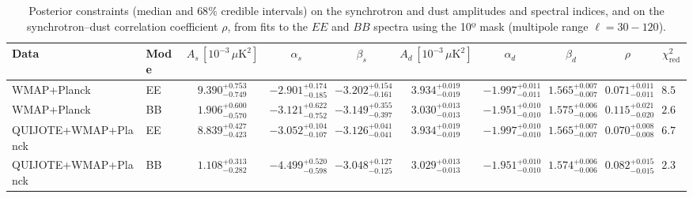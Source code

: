 \begin{table}[h]
\centering
\scriptsize
\setlength{\tabcolsep}{4pt}
\caption{Posterior constraints (median and $68\%$ credible intervals) on the synchrotron and dust amplitudes and spectral indices, and on the synchrotron--dust correlation coefficient $\rho$, from fits to the $EE$ and $BB$ spectra using the 10º mask (multipole range $\ell=30-120$).}
\label{tab:fit_results}
\begin{tabular}{llcccccccc}
\toprule
Data & Mode & $A_s\,[10^{-3}\,\mu\mathrm{K}^2]$ & $\alpha_s$ & $\beta_s$ & $A_d\,[10^{-3}\,\mu\mathrm{K}^2]$ & $\alpha_d$ & $\beta_d$ & $\rho$ & $\chi^2_\mathrm{red}$ \\
\midrule
WMAP+Planck & EE & $9.390^{+0.753}_{-0.749}$ & $-2.901^{+0.174}_{-0.185}$ & $-3.202^{+0.154}_{-0.161}$ & $3.934^{+0.019}_{-0.019}$ & $-1.997^{+0.011}_{-0.011}$ & $1.565^{+0.007}_{-0.007}$ & $0.071^{+0.011}_{-0.011}$ & $8.50$ \\
WMAP+Planck & BB & $1.906^{+0.600}_{-0.570}$ & $-3.121^{+0.622}_{-0.752}$ & $-3.149^{+0.355}_{-0.397}$ & $3.030^{+0.013}_{-0.013}$ & $-1.951^{+0.010}_{-0.010}$ & $1.575^{+0.006}_{-0.006}$ & $0.115^{+0.021}_{-0.020}$ & $2.63$ \\
QUIJOTE+WMAP+Planck & EE & $8.839^{+0.427}_{-0.423}$ & $-3.052^{+0.104}_{-0.107}$ & $-3.126^{+0.041}_{-0.041}$ & $3.934^{+0.019}_{-0.019}$ & $-1.997^{+0.010}_{-0.010}$ & $1.565^{+0.007}_{-0.007}$ & $0.070^{+0.008}_{-0.008}$ & $6.76$ \\
QUIJOTE+WMAP+Planck & BB & $1.108^{+0.313}_{-0.282}$ & $-4.499^{+0.520}_{-0.598}$ & $-3.048^{+0.127}_{-0.125}$ & $3.029^{+0.013}_{-0.013}$ & $-1.951^{+0.010}_{-0.010}$ & $1.574^{+0.006}_{-0.006}$ & $0.082^{+0.015}_{-0.015}$ & $2.35$ \\
\bottomrule
\end{tabular}
\end{table}
